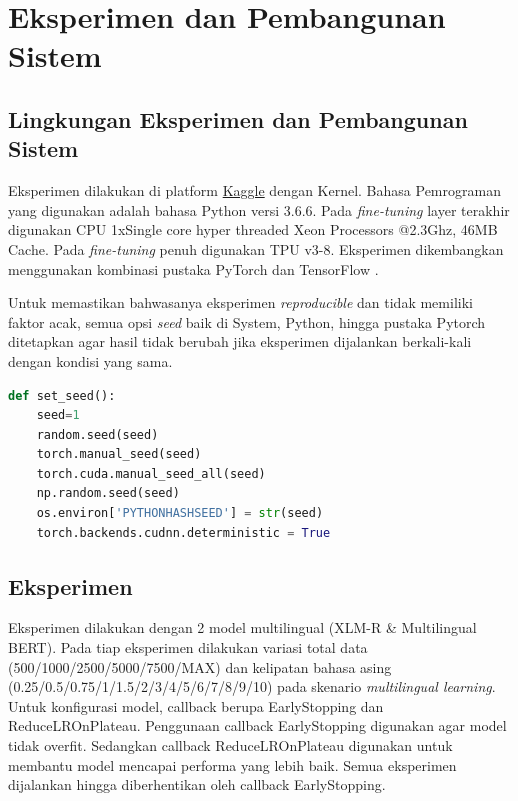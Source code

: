 \chapter{Eksperimen dan Pembangunan Sistem}

\section{Lingkungan Eksperimen dan Pembangunan Sistem}

Eksperimen dilakukan di platform \href{https://www.kaggle.com}{Kaggle} dengan Kernel. Bahasa Pemrograman yang digunakan adalah bahasa Python versi 3.6.6. Pada \textit{fine-tuning} layer terakhir digunakan CPU 1xSingle core hyper threaded Xeon Processors @2.3Ghz, 46MB Cache. Pada \textit{fine-tuning} penuh digunakan TPU v3-8. Eksperimen dikembangkan menggunakan kombinasi pustaka PyTorch \parencite{paszke2017automatic} dan TensorFlow \parencite{tensorflow2015}.

Untuk memastikan bahwasanya eksperimen \textit{reproducible} dan tidak memiliki faktor acak, semua opsi \textit{seed} baik di System, Python, hingga pustaka Pytorch ditetapkan agar hasil tidak berubah jika eksperimen dijalankan berkali-kali dengan kondisi yang sama.

\begin{lstlisting}[language=Python]
def set_seed():
    seed=1
    random.seed(seed)
    torch.manual_seed(seed)
    torch.cuda.manual_seed_all(seed)
    np.random.seed(seed)
    os.environ['PYTHONHASHSEED'] = str(seed)
    torch.backends.cudnn.deterministic = True
\end{lstlisting}


\section{Eksperimen}
Eksperimen dilakukan dengan 2 model multilingual (XLM-R \& Multilingual BERT). Pada tiap eksperimen dilakukan variasi total data (500/1000/2500/5000/7500/MAX) dan kelipatan bahasa asing (0.25/0.5/0.75/1/1.5/2/3/4/5/6/7/8/9/10) pada skenario \textit{multilingual learning}. Untuk konfigurasi model, callback berupa EarlyStopping dan ReduceLROnPlateau. Penggunaan callback EarlyStopping digunakan agar model tidak overfit. Sedangkan callback ReduceLROnPlateau digunakan untuk membantu model mencapai performa yang lebih baik. Semua eksperimen dijalankan hingga diberhentikan oleh callback EarlyStopping.

